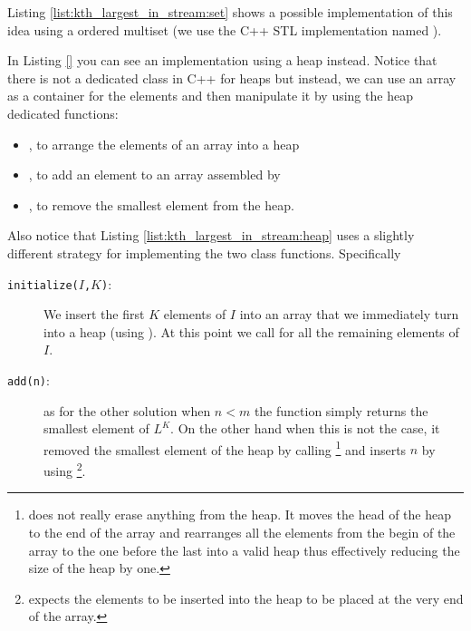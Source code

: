 Listing \ref{list:kth_largest_in_stream:set} shows a possible implementation of this idea using a
ordered multiset (we use the C++ STL implementation named ). 


In Listing \ref{} you can see an implementation using a heap instead. Notice that there is not a
dedicated class in C++ for heaps but instead, we can use an array as a container for the elements
and then manipulate it by using the heap dedicated functions: 
\begin{itemize}
	\item {}, to arrange the elements of an array into a heap
	\item {}, to add an element to an array assembled by 
	\item {}, to remove the smallest element from the heap.
\end{itemize}

Also notice that Listing \ref{list:kth_largest_in_stream:heap} uses a slightly different strategy
for implementing the two class functions. Specifically
\begin{description}
	\item[\texttt{initialize($I$,$K$)}:] We  insert the first $K$ elements of $I$ into an array that
	we immediately turn into a heap (using ). At this point we call
	 for all the remaining elements of $I$.
	\item [\texttt{add(n)}:] as for the other solution when  $n < m$ the function simply returns the
	smallest element of $L^K$. On the other hand when this is not the case, it removed the smallest
	element of the heap by calling \footnote{ does not really erase
	anything from the heap. It moves the head of the heap to the end of the array and rearranges all
	the elements  from the begin of the array to the one before the last into a valid heap thus
	effectively reducing the size of the heap by one.} and inserts $n$ by using
	\footnote{ expects the elements to be inserted into the heap
	to be placed at the very end of the array.}.
\end{description}



